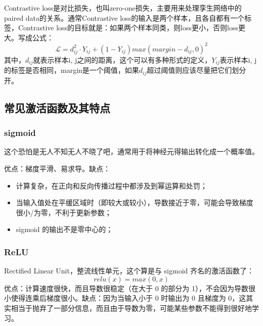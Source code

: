 Contrastive loss是对比损失，也叫zero-one损失，主要用来处理孪生网络中的paired data的关系。通常Contrastive loss的输入是两个样本，且各自都有一个标签，Contrastive loss的目标就是：如果两个样本同类，则loss更小，否则loss更大。写成公式：
$$
\mathcal{L} = d_{ij}^2 \cdot Y_{ij} + (1 - Y_{ij} )max(margin - d_{ij}, 0)^2
$$
其中，$d_{ij}$就表示样本i, j之间的距离，这个可以有多种形式的定义，$Y_{ij}$表示样本i, j的标签是否相同，margin是一个阈值，如果$d_{ij}$超过阈值则应该尽量把它们划分开。

\subsection{常见激活函数及其特点}
\subsubsection{sigmoid}
\begin{center}
\end{center}
这个恐怕是无人不知无人不晓了吧，通常用于将神经元得输出转化成一个概率值。

优点：梯度平滑、易求导。缺点：
\begin{itemize}
	\item 计算复杂，在正向和反向传播过程中都涉及到幂运算和处罚；
	
	\item 当输入值处在平缓区域时（即较大或较小），导数接近于零，可能会导致梯度很小/为零，不利于更新参数；
	
	\item sigmoid 的输出不是零中心的；
\end{itemize}


\subsubsection{ReLU}
Rectified Linear Unit，整流线性单元，这个算是与 sigmoid 齐名的激活函数了：
$$
relu(x) = max(0, x)
$$
优点：计算速度很快，而且导数很稳定（在大于 0 的部分为 1），不会因为导数很小使得连乘后梯度很小。缺点：因为当输入小于 0 时输出为 0 且梯度为 0，这其实相当于抛弃了一部分信息，而且由于导数为零，可能某些参数不能得到很好地学习。

